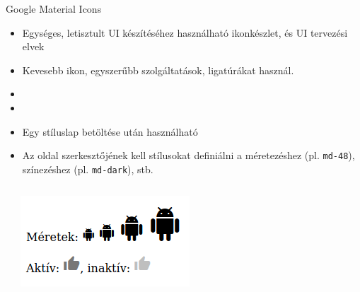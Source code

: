 \begin{frame}
  Google Material Icons
  \begin{itemize}
    \item Egységes, letisztult UI készítéséhez használható ikonkészlet, és UI tervezési elvek
    \item Kevesebb ikon, egyszerűbb szolgáltatások, ligatúrákat használ.
    \item {}
    \item {}
    \item Egy stíluslap betöltése után használható
    \item Az oldal szerkesztőjének kell stílusokat definiálni a méretezéshez (pl. \texttt{md-48}), színezéshez (pl. \texttt{md-dark}), stb.
  \end{itemize}
\end{frame}

\begin{frame}
  \begin{columns}[c]
      \begin{exampleblock}{}
        \scriptsize
        
        
      \end{exampleblock}
      \includegraphics[width=\textwidth]{material.png}
  \end{columns}
\end{frame}
